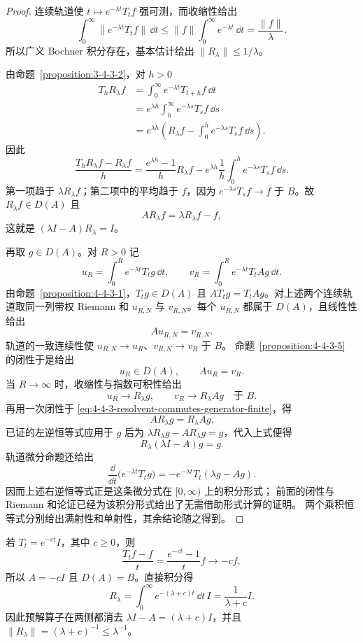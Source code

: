 \begin{proof}
连续轨道使 $t\mapsto e^{-\lambda t}T_tf$ 强可测，而收缩性给出
\[
 \int_0^\infty\|e^{-\lambda t}T_tf\|\,\dd t
 \le\|f\|\int_0^\infty e^{-\lambda t}\,\dd t
 =\frac{\|f\|}{\lambda}.
\]
所以广义 Bochner 积分存在，基本估计给出
$\|R_\lambda\|\le1/\lambda$。

由命题~\ref{proposition:3-4-3-2}，对 $h>0$
\begin{align*}
 T_hR_\lambda f
 &=\int_0^\infty e^{-\lambda t}T_{t+h}f\,\dd t\\
 &=e^{\lambda h}\int_h^\infty e^{-\lambda s}T_sf\,\dd s\\
 &=e^{\lambda h}\left(R_\lambda f-
     \int_0^h e^{-\lambda s}T_sf\,\dd s\right).
\end{align*}
因此
\[
 \frac{T_hR_\lambda f-R_\lambda f}{h}
 =\frac{e^{\lambda h}-1}{h}R_\lambda f
 -e^{\lambda h}\frac1h\int_0^he^{-\lambda s}T_sf\,\dd s.
\]
第一项趋于 $\lambda R_\lambda f$；第二项中的平均趋于 $f$，因为
$e^{-\lambda s}T_sf\to f$ 于 $B$。故 $R_\lambda f\in D(A)$ 且
\[
 AR_\lambda f=\lambda R_\lambda f-f,
\]
这就是 $(\lambda I-A)R_\lambda=I$。

再取 $g\in D(A)$。对 $R>0$ 记
\[
 u_R=\int_0^R e^{-\lambda t}T_tg\,\dd t,
 \qquad
 v_R=\int_0^R e^{-\lambda t}T_tAg\,\dd t.
\]
由命题~\ref{proposition:4-4-3-1}，$T_tg\in D(A)$ 且
$AT_tg=T_tAg$。对上述两个连续轨道取同一列带权 Riemann 和
$u_{R,N}$ 与 $v_{R,N}$。每个 $u_{R,N}$ 都属于 $D(A)$，且线性性给出
\[
 Au_{R,N}=v_{R,N}.
\]
轨道的一致连续性使 $u_{R,N}\to u_R$、$v_{R,N}\to v_R$ 于 $B$。
命题~\ref{proposition:4-4-3-5} 的闭性于是给出
\begin{equation}\label{eq:4-4-3-resolvent-commutes-generator-finite}
 u_R\in D(A),\qquad Au_R=v_R.
\end{equation}
当 $R\to\infty$ 时，收缩性与指数可积性给出
\[
 u_R\longrightarrow R_\lambda g,
 \qquad v_R\longrightarrow R_\lambda Ag
 \quad\text{于 }B.
\]
再用一次闭性于 \eqref{eq:4-4-3-resolvent-commutes-generator-finite}，得
\[
 AR_\lambda g=R_\lambda Ag.
\]
已证的左逆恒等式应用于 $g$ 后为
$\lambda R_\lambda g-AR_\lambda g=g$，代入上式便得
\[
 R_\lambda(\lambda I-A)g=g.
\]
轨道微分命题还给出
\[
 \frac{\dd}{\dd t}\bigl(e^{-\lambda t}T_tg\bigr)
 =-e^{-\lambda t}T_t(\lambda g-Ag).
\]
因而上述右逆恒等式正是这条微分式在 $[0,\infty)$ 上的积分形式；
前面的闭性与 Riemann 和论证已经为该积分形式给出了无需借助形式计算的证明。
两个乘积恒等式分别给出满射性和单射性，其余结论随之得到。
\end{proof}

\begin{example}[标量半群]
若 $T_t=e^{-ct}I$，其中 $c\ge0$，则
\[
 \frac{T_tf-f}{t}=\frac{e^{-ct}-1}{t}f\longrightarrow-cf,
\]
所以 $A=-cI$ 且 $D(A)=B$。直接积分得
\[
 R_\lambda=\int_0^\infty e^{-(\lambda+c)t}\,\dd t\,I
 =\frac1{\lambda+c}I.
\]
因此预解算子在两侧都消去 $\lambda I-A=(\lambda+c)I$，并且
$\|R_\lambda\|=(\lambda+c)^{-1}\le\lambda^{-1}$。
\end{example}

